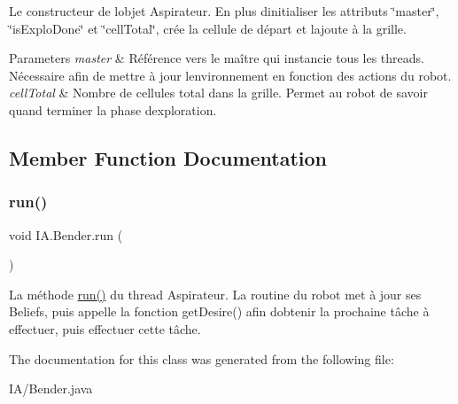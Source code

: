 Le constructeur de l\textquotesingle{}objet Aspirateur. En plus d\textquotesingle{}initialiser les attributs \char`\"{}master\char`\"{}, \char`\"{}is\+Explo\+Done\char`\"{} et \char`\"{}cell\+Total\char`\"{}, crée la cellule de départ et l\textquotesingle{}ajoute à la grille.


\begin{DoxyParams}{Parameters}
{\em master} & Référence vers le maître qui instancie tous les threads. Nécessaire afin de mettre à jour l\textquotesingle{}environnement en fonction des actions du robot. \\
\hline
{\em cell\+Total} & Nombre de cellules total dans la grille. Permet au robot de savoir quand terminer la phase d\textquotesingle{}exploration. \\
\hline
\end{DoxyParams}


\subsection{Member Function Documentation}
\hypertarget{class_i_a_1_1_bender_a39093dae1a9f2b190e32fc5305a46533}{}\label{class_i_a_1_1_bender_a39093dae1a9f2b190e32fc5305a46533} 
\subsubsection{\texorpdfstring{run()}{run()}}
{\footnotesize\ttfamily void I\+A.\+Bender.\+run (\begin{DoxyParamCaption}{ }\end{DoxyParamCaption})}

La méthode \hyperlink{class_i_a_1_1_bender_a39093dae1a9f2b190e32fc5305a46533}{run()} du thread Aspirateur. La routine du robot met à jour ses Beliefs, puis appelle la fonction get\+Desire() afin d\textquotesingle{}obtenir la prochaine tâche à effectuer, puis effectuer cette tâche. 

The documentation for this class was generated from the following file\+:\begin{DoxyCompactItemize}
\item 
I\+A/Bender.\+java\end{DoxyCompactItemize}
